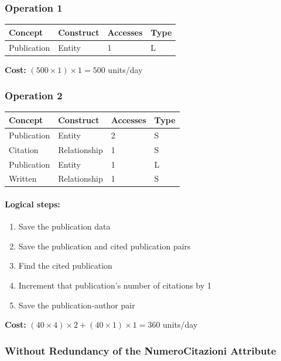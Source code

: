 \documentclass[a4paper,12pt]{article}
\begin{document}
\subsubsection*{Operation 1}
\begin{tabular}{llll}
\toprule
\textbf{Concept} & \textbf{Construct} & \textbf{Accesses} & \textbf{Type} \\
\midrule
Publication & Entity & 1 & L \\
\bottomrule
\end{tabular}

\medskip
\textbf{Cost:} $(500 \times 1) \times 1 = 500$ units/day

\subsubsection*{Operation 2}
\begin{tabular}{llll}
\toprule
\textbf{Concept} & \textbf{Construct} & \textbf{Accesses} & \textbf{Type} \\
\midrule
Publication & Entity & 2 & S \\
Citation          & Relationship & 1 & S \\
Publication & Entity & 1 & L \\
Written        & Relationship & 1 & S \\
\bottomrule
\end{tabular}

\paragraph{Logical steps:}
\begin{enumerate}[label=\textbf{\arabic*)}, start=1, leftmargin=1.5cm]
    \item Save the publication data
    \item Save the publication and cited publication pairs
    \item Find the cited publication
    \item Increment that publication's number of citations by 1
    \item Save the publication-author pair
\end{enumerate}

\textbf{Cost:} $(40 \times 4) \times 2 + (40 \times 1) \times 1 = 360$ units/day

\subsubsection{Without Redundancy of the NumeroCitazioni Attribute} 
\end{document}

